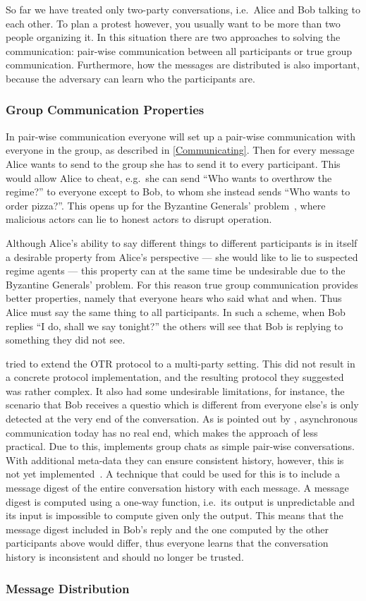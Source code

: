 So far we have treated only two-party conversations, i.e.\ Alice and Bob 
talking to each other.
To plan a protest however, you usually want to be more than two people 
organizing it.
In this situation there are two approaches to solving the communication:
pair-wise communication between all participants or true group communication.
Furthermore, how the messages are distributed is also important, because the 
adversary can learn who the participants are.

\subsubsection{Group Communication Properties}

In pair-wise communication everyone will set up a pair-wise communication with 
everyone in the group, as described in \cref{Communicating}.
Then for every message Alice wants to send to the group she has to send it to 
every participant.
This would allow Alice to cheat, e.g.\ she can send \enquote{Who wants to 
  overthrow the regime?} to everyone except to Bob, to whom she instead sends 
\enquote{Who wants to order pizza?}.
This opens up for the Byzantine Generals' problem~\cite{ByzantineGenerals}, 
where malicious actors can lie to honest actors to disrupt operation.
  
Although Alice's ability to say different things to different participants is 
in itself a desirable property from Alice's perspective --- she would like to 
lie to suspected regime agents --- this property can at the same time be 
undesirable due to the Byzantine Generals' problem.
For this reason true group communication provides better properties, namely 
that everyone hears who said what and when.
Thus Alice must say the same thing to all participants.
In such a scheme, when Bob replies \enquote{I do, shall we say tonight?} the 
others will see that Bob is replying to something they did not see.

\citet{multiotr2009} tried to extend the \ac{OTR} protocol to a multi-party 
setting.
This did not result in a concrete protocol implementation, and the resulting 
protocol they suggested was rather complex.
It also had some undesirable limitations, for instance, the scenario that Bob 
receives a questio which is different from everyone else's is only detected at 
the very end of the conversation.
As is pointed out by \citet{TSgroups}, asynchronous communication today has no 
real end, which makes the approach of \citet{multiotr2009} less 
practical.
Due to this, \citet{SignalApp} implements group chats as simple pair-wise 
conversations.
With additional meta-data they can ensure consistent history, however, this is 
not yet implemented~\cite{TSgroups}.
A technique that could be used for this is to include a message digest of the 
entire conversation history with each message.
A message digest is computed using a one-way function, i.e.\ its output is 
unpredictable and its input is impossible to compute given only the output.
This means that the message digest included in Bob's reply and the one computed 
by the other participants above would differ, thus everyone learns that the 
conversation history is inconsistent and should no longer be trusted.

\subsubsection{Message Distribution}



